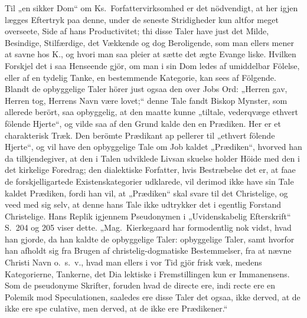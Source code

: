 \documentclass[12pt,a4paper]{article}
\newcommand{\opage}[1]{\marginnote{\footnotesize\textit{[#1]}}}
\begin{document}
Til „en sikker Dom“ om Ks.\ Forfattervirksomhed
er det nödvendigt, at her igjen lægges Eftertryk paa
denne, under de seneste Stridigheder kun altfor meget
overseete, Side af hans Productivitet; thi disse Taler have
just det Milde, Besindige, Stilfærdige, det Vækkende og
dog Beroligende, som man ellers mener at savne hos
K., og hvori man saa pleier at sætte det ægte Evange\-%
liske. Hvilken Forskjel det i saa Henseende gjör, om
man i sin Dom ledes af umiddelbar Fölelse, eller af en
tydelig Tanke, en bestemmende Kategorie, kan sees
af Fölgende. Blandt de opbyggelige Taler hörer just
ogsaa den over Jobs Ord: „Herren gav, Herren tog,
Herrens Navn være lovet;“ denne Tale fandt Biskop
Mynster, som allerede berört, saa opbyggelig, at den
maatte kunne „tiltale, vederqvæge ethvert fölende Hjerte“,
og vilde saa af den Grund kalde den en Prædiken. Her
\opage{10} %
er et charakterisk Træk. Den berömte Prædikant ap\-%
pellerer til „ethvert fölende Hjerte“, og vil have den
opbyggelige Tale om Job kaldet „Prædiken“, hvorved
han da tilkjendegiver, at den i Talen udviklede Livsan\-%
skuelse holder Höide med den i det kirkelige Foredrag;
den dialektiske Forfatter, hvis Bestræbelse det er, at faae
de forskjelligartede Existenskategorier udklarede, vil
derimod ikke have sin Tale kaldet Prædiken, fordi han
vil, at „Prædiken“ skal svare til det Christelige, og veed
med sig selv, at denne hans Tale ikke udtrykker det i
egentlig Forstand Christelige. Hans Replik igjennem
Pseudonymen i „Uvidenskabelig Efterskrift“ S.\ 204 og
205 viser dette. „Mag.\ Kierkegaard har formodentlig nok
vidst, hvad han gjorde, da han kaldte de opbyggelige
Taler: opbyggelige Taler, samt hvorfor han afholdt sig
fra Brugen af christelig-dogmatiske Bestemmelser, fra at
nævne Christi Navn o.\ s.\ v., hvad man ellers i vor Tid
gjör frisk væk, medens Kategorierne, Tankerne, det Dia\-%
lektiske i Fremstillingen kun er Immanensens. Som de
pseudonyme Skrifter, foruden hvad de directe ere, indi\-%
recte ere en Polemik mod Speculationen, saaledes ere
disse Taler det ogsaa, ikke derved, at de ikke ere spe\-%
culative, men derved, at de ikke ere Prædikener.“
\end{document}
